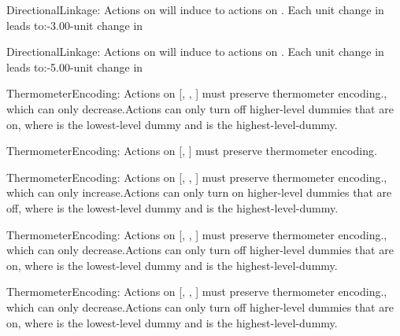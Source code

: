 \begin{constraints}
\item DirectionalLinkage: Actions on  will induce to actions on . Each unit change in  leads to:-3.00-unit change in 
\item DirectionalLinkage: Actions on  will induce to actions on . Each unit change in  leads to:-5.00-unit change in 
\item ThermometerEncoding: Actions on [, , ] must preserve thermometer encoding., which can only decrease.Actions can only turn off higher-level dummies that are on, where  is the lowest-level dummy and  is the highest-level-dummy.
\item ThermometerEncoding: Actions on [, ] must preserve thermometer encoding.
\item ThermometerEncoding: Actions on [, , ] must preserve thermometer encoding., which can only increase.Actions can only turn on higher-level dummies that are off, where  is the lowest-level dummy and  is the highest-level-dummy.
\item ThermometerEncoding: Actions on [, , ] must preserve thermometer encoding., which can only decrease.Actions can only turn off higher-level dummies that are on, where  is the lowest-level dummy and  is the highest-level-dummy.
\item ThermometerEncoding: Actions on [, , ] must preserve thermometer encoding., which can only decrease.Actions can only turn off higher-level dummies that are on, where  is the lowest-level dummy and  is the highest-level-dummy.

\end{constraints}
